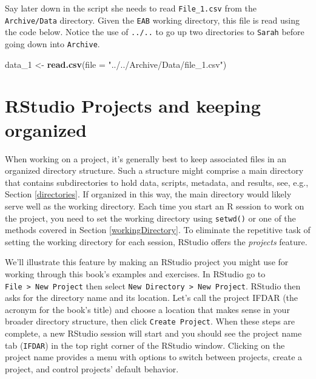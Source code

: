 \documentclass[
  11pt,
]{krantz}
\newenvironment{Shaded}{\begin{snugshade}}{\end{snugshade}}
\newcommand{\DataTypeTok}[1]{\textcolor[rgb]{0.13,0.29,0.53}{#1}}
\newcommand{\DecValTok}[1]{\textcolor[rgb]{0.00,0.00,0.81}{#1}}
\newcommand{\KeywordTok}[1]{\textcolor[rgb]{0.13,0.29,0.53}{\textbf{#1}}}
\newcommand{\NormalTok}[1]{#1}
\newcommand{\StringTok}[1]{\textcolor[rgb]{0.31,0.60,0.02}{#1}}
\theoremstyle{definition}
\theoremstyle{definition}
\theoremstyle{definition}
\theoremstyle{definition}
\theoremstyle{remark}
\begin{document}
Say later down in the script she needs to read \texttt{File\_1.csv} from the \texttt{Archive/Data} directory. Given the \texttt{EAB} working directory, this file is read using the code below. Notice the use of \texttt{../..} to go up two directories to \texttt{Sarah} before going down into \texttt{Archive}.

\begin{Shaded}
\begin{Highlighting}[]
\NormalTok{data\_}\DecValTok{1}\NormalTok{ \textless{}{-}}\StringTok{ }\KeywordTok{read.csv}\NormalTok{(}\DataTypeTok{file =} \StringTok{"../../Archive/Data/file\_1.csv"}\NormalTok{)}
\end{Highlighting}
\end{Shaded}

\hypertarget{projects}{%
\section{RStudio Projects and keeping organized}\label{projects}}

When working on a project, it's generally best to keep associated files in an organized directory structure. Such a structure might comprise a main directory that contains subdirectories to hold data, scripts, metadata, and results, see, e.g., Section \ref{directories}. If organized in this way, the main directory would likely serve well as the working directory. Each time you start an R session to work on the project, you need to set the working directory using \texttt{setwd()} or one of the methods covered in Section \ref{workingDirectory}. To eliminate the repetitive task of setting the working directory for each session, RStudio offers the \emph{projects} feature.

We'll illustrate this feature by making an RStudio project you might use for working through this book's examples and exercises. In RStudio go to \texttt{File\ \textgreater{}\ New\ Project} then select \texttt{New\ Directory\ \textgreater{}\ New\ Project}. RStudio then asks for the directory name and its location. Let's call the project IFDAR (the acronym for the book's title) and choose a location that makes sense in your broader directory structure, then click \texttt{Create\ Project}. When these steps are complete, a new RStudio session will start and you should see the project name tab (\texttt{IFDAR}) in the top right corner of the RStudio window. Clicking on the project name provides a menu with options to switch between projects, create a project, and control projects' default behavior.
\end{document}
